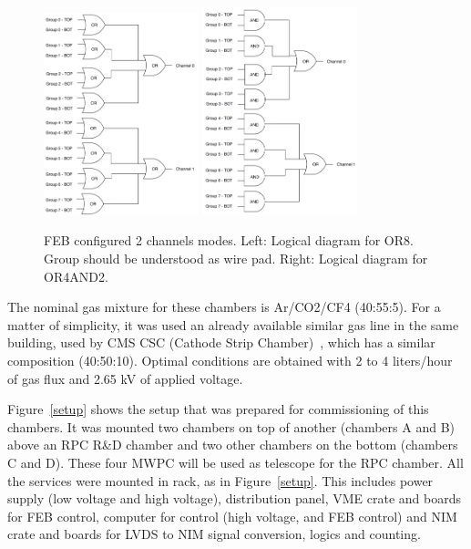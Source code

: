 \begin{figure}[!htbp]
\begin{center}
\includegraphics[width=0.40\textwidth,keepaspectratio]{figures/rpc/mwpc/or8.png}\hspace*{1.cm}
\includegraphics[width=0.40\textwidth,keepaspectratio]{figures/rpc/mwpc/or4and2.png}\hspace*{1.cm}
\end{center}\vspace*{-.5cm}
\caption{FEB configured 2 channels modes. Left: Logical diagram for OR8. Group should be understood as wire pad. Right: Logical diagram for OR4AND2.}
\label{2channels}
\end{figure}

The nominal gas mixture for these chambers is Ar/CO2/CF4 (40:55:5). For a matter of simplicity, it was used an already available similar gas line in the same building, used by CMS CSC (Cathode Strip Chamber)~\cite{muon_tdr}, which has a similar composition (40:50:10). Optimal conditions are obtained with 2 to 4 liters/hour of gas flux and 2.65 kV of applied voltage.

Figure~\ref{setup} shows the setup that was prepared for commissioning of this chambers. It was mounted two chambers on top of another (chambers A and B) above an RPC R\&D chamber and two other chambers on the bottom (chambers C and D). These four MWPC will be used as telescope for the RPC chamber. All the services were mounted in rack, as in Figure~\ref{setup}. This includes power supply (low voltage and high voltage), distribution panel, VME crate and boards for FEB control, computer for control (high voltage, and FEB control) and NIM crate and boards for LVDS to NIM signal conversion, logics and counting.

